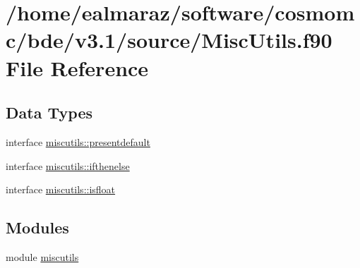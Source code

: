 \hypertarget{MiscUtils_8f90}{}\section{/home/ealmaraz/software/cosmomc/bde/v3.1/source/\+Misc\+Utils.f90 File Reference}
\label{MiscUtils_8f90}
\subsection*{Data Types}
\begin{DoxyCompactItemize}
\item 
interface \mbox{\hyperlink{interfacemiscutils_1_1presentdefault}{miscutils\+::presentdefault}}
\item 
interface \mbox{\hyperlink{interfacemiscutils_1_1ifthenelse}{miscutils\+::ifthenelse}}
\item 
interface \mbox{\hyperlink{interfacemiscutils_1_1isfloat}{miscutils\+::isfloat}}
\end{DoxyCompactItemize}
\subsection*{Modules}
\begin{DoxyCompactItemize}
\item 
module \mbox{\hyperlink{namespacemiscutils}{miscutils}}
\end{DoxyCompactItemize}
